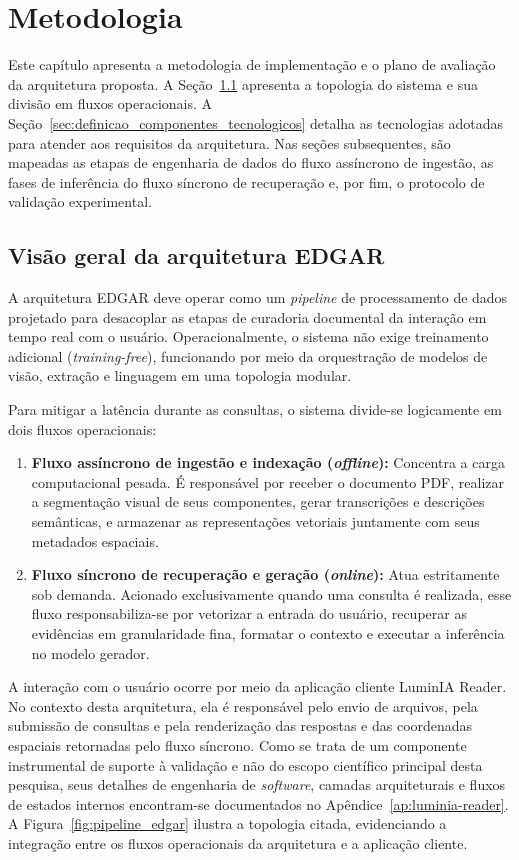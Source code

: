 \chapter{Metodologia}
\label{chap:metodologia}

Este capítulo apresenta a metodologia de implementação e o plano de avaliação da arquitetura proposta. A Seção~\ref{sec:visao_geral_arquitetura_edgar} apresenta a topologia do sistema e sua divisão em fluxos operacionais. A Seção~\ref{sec:definicao_componentes_tecnologicos} detalha as tecnologias adotadas para atender aos requisitos da arquitetura. Nas seções subsequentes, são mapeadas as etapas de engenharia de dados do fluxo assíncrono de ingestão, as fases de inferência do fluxo síncrono de recuperação e, por fim, o protocolo de validação experimental.

\section{Visão geral da arquitetura EDGAR}
\label{sec:visao_geral_arquitetura_edgar}

A arquitetura EDGAR deve operar como um \textit{pipeline} de processamento de dados projetado para desacoplar as etapas de curadoria documental da interação em tempo real com o usuário. Operacionalmente, o sistema não exige treinamento adicional (\textit{training-free}), funcionando por meio da orquestração de modelos de visão, extração e linguagem em uma topologia modular. 

Para mitigar a latência durante as consultas, o sistema divide-se logicamente em dois fluxos operacionais:
\begin{enumerate}
    \item \textbf{Fluxo assíncrono de ingestão e indexação (\textit{offline}):} Concentra a carga computacional pesada. É responsável por receber o documento PDF, realizar a segmentação visual de seus componentes, gerar transcrições e descrições semânticas, e armazenar as representações vetoriais juntamente com seus metadados espaciais.
    \item \textbf{Fluxo síncrono de recuperação e geração (\textit{online}):} Atua estritamente sob demanda. Acionado exclusivamente quando uma consulta é realizada, esse fluxo responsabiliza-se por vetorizar a entrada do usuário, recuperar as evidências em granularidade fina, formatar o contexto e executar a inferência no modelo gerador.
\end{enumerate}

A interação com o usuário ocorre por meio da aplicação cliente LuminIA Reader. No contexto desta arquitetura, ela é responsável pelo envio de arquivos, pela submissão de consultas e pela renderização das respostas e das coordenadas espaciais retornadas pelo fluxo síncrono. Como se trata de um componente instrumental de suporte à validação e não do escopo científico principal desta pesquisa, seus detalhes de engenharia de \textit{software}, camadas arquiteturais e fluxos de estados internos encontram-se documentados no Apêndice~\ref{ap:luminia-reader}. A Figura~\ref{fig:pipeline_edgar} ilustra a topologia citada, evidenciando a integração entre os fluxos operacionais da arquitetura e a aplicação cliente.

